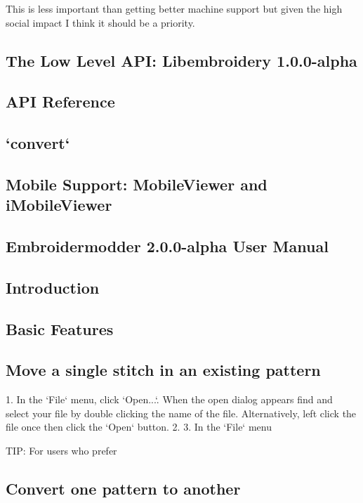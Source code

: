 \documentclass[a4paper]{report}
\begin{document}
This is less important than getting better machine support but given the high social impact I think it should be a priority.

\subsection{The Low Level API: Libembroidery 1.0.0-alpha}


\subsection{API Reference}

\subsection{`convert`}


\subsection{Mobile Support: MobileViewer and iMobileViewer}

\subsection{Embroidermodder 2.0.0-alpha User Manual}

\subsection{Introduction}

\subsection{Basic Features}

\subsection{Move a single stitch in an existing pattern}

1. In the `File` menu, click `Open...`. When the open dialog appears find and select your file by double clicking the name of the file. Alternatively, left click the file once then click the `Open` button.
2. 
3. In the `File` menu

TIP: For users who prefer

\subsection{Convert one pattern to another}
\end{document}
